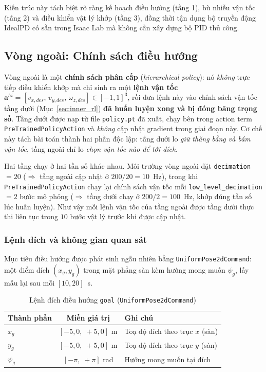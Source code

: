 Kiến trúc này tách biệt rõ ràng kế hoạch điều hướng (tầng 1),
bù nhiễu vận tốc (tầng 2) và điều khiển vật lý khớp
(tầng 3), đồng thời tận dụng bộ truyền động IdealPD có sẵn trong Isaac Lab
mà không cần xây dựng bộ PID thủ công.


\subsection{Vòng ngoài: Chính sách điều hướng}
\label{sec:outer_rl}

Vòng ngoài là một \textbf{chính sách phân cấp} (\textit{hierarchical
policy}): nó \emph{không} trực tiếp điều khiển khớp mà chỉ sinh ra một
\textbf{lệnh vận tốc}
$\mathbf{a}^{hi}=[v_{x,des},\,v_{y,des},\,\omega_{z,des}]\in[-1,1]^3$,
rồi đưa lệnh này vào chính sách vận tốc tầng dưới
(Mục~\ref{sec:inner_rl}) \textbf{đã huấn luyện xong và bị đóng băng trọng
số}. Tầng dưới được nạp từ file \texttt{policy.pt} đã xuất, chạy bên trong
action term \texttt{PreTrainedPolicyAction} và \emph{không} cập nhật gradient
trong giai đoạn này. Cơ chế này tách bài toán thành hai phần độc lập: tầng
dưới lo \textit{giữ thăng bằng và bám vận tốc}, tầng ngoài chỉ lo
\textit{chọn vận tốc nào để tới đích}.

Hai tầng chạy ở hai tần số khác nhau. Môi trường vòng ngoài đặt
\texttt{decimation}${=}20$ ($\Rightarrow$ tầng ngoài cập nhật ở
$200/20=10$~Hz), trong khi \texttt{PreTrainedPolicyAction} chạy lại chính
sách vận tốc mỗi \texttt{low\_level\_decimation}${=}2$ bước mô phỏng
($\Rightarrow$ tầng dưới chạy ở $200/2=100$~Hz, khớp đúng tần số lúc huấn
luyện). Như vậy mỗi lệnh vận tốc của tầng ngoài được tầng dưới thực thi
liên tục trong $10$ bước vật lý trước khi được cập nhật.

\subsubsection{Lệnh đích và không gian quan sát}

Mục tiêu điều hướng được phát sinh ngẫu nhiên bằng
\texttt{UniformPose2dCommand}: một điểm đích $(x_g, y_g)$ trong mặt phẳng
sàn kèm hướng mong muốn $\psi_g$, lấy mẫu lại sau mỗi $[10,20]$~s.

\begin{table}[H]
    \centering
    \caption{Lệnh đích điều hướng \texttt{goal} (\texttt{UniformPose2dCommand})}
    \label{tab:nav_goal}
    \renewcommand{\arraystretch}{1.3}
    \begin{tabular}{|l|c|l|}
    \hline
    \textbf{Thành phần} & \textbf{Miền giá trị} & \textbf{Ghi chú} \\
    \hline
    $x_g$    & $[-5{,}0,\;+5{,}0]$ m       & Toạ độ đích theo trục $x$ (sàn) \\
    $y_g$    & $[-5{,}0,\;+5{,}0]$ m       & Toạ độ đích theo trục $y$ (sàn) \\
    $\psi_g$ & $[-\pi,\;+\pi]$ rad         & Hướng mong muốn tại đích \\
    \hline
    \end{tabular}
\end{table}

